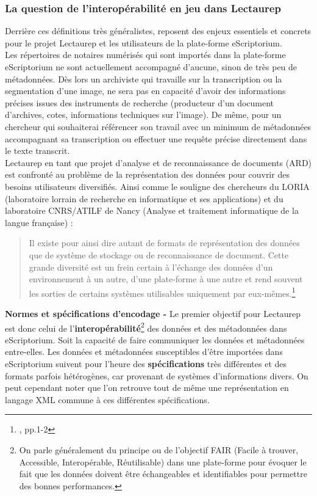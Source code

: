 \subsubsection{La question de l'interopérabilité en jeu dans Lectaurep}
Derrière ces définitions très généralistes, reposent des enjeux essentiels et concrets pour le projet Lectaurep et les utilisateurs de la plate-forme eScriptorium. \\

Les répertoires de notaires numérisés qui sont importés dans la plate-forme eScriptorium ne sont actuellement accompagné d'aucune, sinon de très peu de métadonnées. Dès lors un archiviste qui travaille sur la transcription ou la segmentation d'une image, ne sera pas en capacité d'avoir des informations précises issues des instruments de recherche (producteur d'un document d'archives, cotes, informations techniques sur l'image). De même, pour un chercheur qui souhaiterai référencer son travail avec un minimum de métadonnées accompagnant sa transcription ou effectuer une requête précise directement dans le texte transcrit.\\ 

Lectaurep en tant que projet d'analyse et de reconnaissance de documents (ARD) est confronté au problème de la représentation des données pour couvrir des besoins utilisateurs diversifiés. Ainsi comme le souligne des chercheurs du LORIA (laboratoire lorrain de recherche en informatique et ses applications) et du laboratoire CNRS/ATILF de Nancy (Analyse et traitement informatique de la langue française) : 
\begin{quote}
    Il existe pour ainsi dire autant de formats de représentation des données que de système de stockage ou de reconnaissance de document. Cette grande diversité est un frein certain à l'échange des données d'un environnement à un autre, d'une plate-forme à une autre et rend souvent les sorties de certains systèmes utilisables uniquement par eux-mêmes.\footnote{\cite{belaid_representation_2007}, pp.1-2}
\end{quote}
\newpage
\textbf{Normes et spécifications d'encodage -} Le premier objectif pour Lectaurep est donc celui de l'\textbf{interopérabilité}\footnote{On parle généralement du principe ou de l'objectif FAIR (Facile à trouver, Accessible, Interopérable, Réutilisable) dans une plate-forme pour évoquer le fait que les données doivent être échangeables et identifiables pour permettre des bonnes performances.} des données et des métadonnées dans eScriptorium. Soit la capacité de faire communiquer les données et métadonnées entre-elles. Les données et métadonnées susceptibles d'être importées dans eScriptorium suivent pour l'heure des \textbf{spécifications} très différentes et des formats parfois hétérogènes, car provenant de systèmes d'informations divers. On peut cependant noter que l'on retrouve tout de même une représentation en langage XML commune à ces différentes spécifications.\\ 

